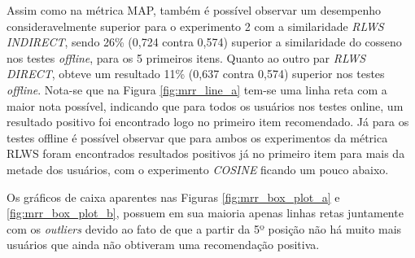 Assim como na métrica \ac{MAP}, também é possível observar um desempenho consideravelmente superior para o experimento 2 com a similaridade \textit{RLWS INDIRECT}, sendo 26\% (0,724 contra 0,574) superior a similaridade do cosseno nos testes \textit{offline}, para os 5 primeiros itens. Quanto ao outro par \textit{RLWS DIRECT}, obteve um resultado 11\% (0,637 contra 0,574) superior nos testes \textit{offline}. Nota-se que na Figura \ref{fig:mrr_line_a} tem-se uma linha reta com a maior nota possível, indicando que para todos os usuários nos testes online, um resultado positivo foi encontrado logo no primeiro item recomendado. Já para os testes offline é possível observar que para ambos os experimentos da métrica \ac{RLWS} foram encontrados resultados positivos já no primeiro item para mais da metade dos usuários, com o experimento \textit{COSINE} ficando um pouco abaixo. 

Os gráficos de caixa aparentes nas Figuras \ref{fig:mrr_box_plot_a} e \ref{fig:mrr_box_plot_b}, possuem em sua maioria apenas linhas retas juntamente com os \textit{outliers} devido ao fato de que a partir da 5º posição não há muito mais usuários que ainda não obtiveram uma recomendação positiva.

